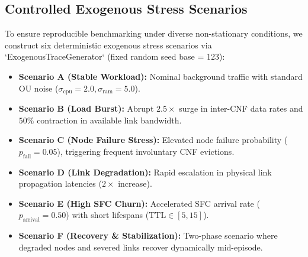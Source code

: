 \documentclass[conference]{IEEEtran}
\begin{document}
\subsection{Controlled Exogenous Stress Scenarios}
To ensure reproducible benchmarking under diverse non-stationary conditions, we construct six deterministic exogenous stress scenarios via `ExogenousTraceGenerator` (fixed random seed base = 123):
\begin{itemize}
    \item \textbf{Scenario A (Stable Workload):} Nominal background traffic with standard OU noise ($\sigma_{\text{cpu}}=2.0, \sigma_{\text{ram}}=5.0$).
    \item \textbf{Scenario B (Load Burst):} Abrupt $2.5\times$ surge in inter-CNF data rates and $50\%$ contraction in available link bandwidth.
    \item \textbf{Scenario C (Node Failure Stress):} Elevated node failure probability ($p_{\text{fail}} = 0.05$), triggering frequent involuntary CNF evictions.
    \item \textbf{Scenario D (Link Degradation):} Rapid escalation in physical link propagation latencies ($2\times$ increase).
    \item \textbf{Scenario E (High SFC Churn):} Accelerated SFC arrival rate ($p_{\text{arrival}} = 0.50$) with short lifespans ($\text{TTL} \in [5, 15]$).
    \item \textbf{Scenario F (Recovery \& Stabilization):} Two-phase scenario where degraded nodes and severed links recover dynamically mid-episode.
\end{itemize}
\end{document}
